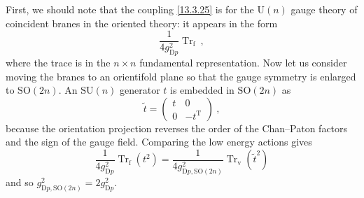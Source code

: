 First, we should note that the coupling \eqref{13.3.25} is for the $\mathrm{U}(n)$ gauge theory of coincident branes in the oriented theory: it appears in the form
\begin{equation}
	\frac{1}{4g_{\mathrm{D}p}^2}\operatorname{Tr}_{\mathrm{f}} \:, \label{13.3.26}
\end{equation}
where the trace is in the $n \times n$ fundamental representation. Now let us consider moving the branes to an orientifold plane so that the gauge symmetry is enlarged to $\mathrm{SO}(2n)$. An $\mathrm{SU}(n)$ generator $t$ is embedded in $\mathrm{SO}(2n)$ as
\begin{equation}
	\tilde{t} = \begin{pmatrix} t & 0 \\ 0 & -t^{\mathrm{T}} \end{pmatrix} \:, \label{13.3.27}
\end{equation}
because the orientation projection reverses the order of the Chan--Paton factors and the sign of the gauge field. Comparing the low energy actions gives
\begin{equation}
	\frac{1}{4g_{\mathrm{D}p}^2}\operatorname{Tr}_{\mathrm{f}}(t^2) = \frac{1}{4g_{\mathrm{D}p,\mathrm{SO}(2n)}^2}\operatorname{Tr}_{\mathrm{v}}(\tilde{t}^2) \label{13.3.28}
\end{equation}
and so $g_{\mathrm{D}p,\mathrm{SO}(2n)}^2 = 2g_{\mathrm{D}p}^2$.

